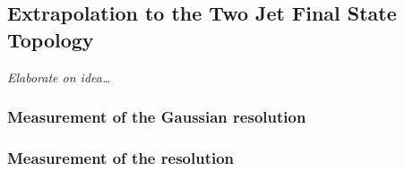 

\subsection{Extrapolation to the Two Jet Final State Topology}

\textit{Elaborate on idea\ldots}


\subsubsection{Measurement of the Gaussian resolution}


\subsubsection{Measurement of the resolution}
